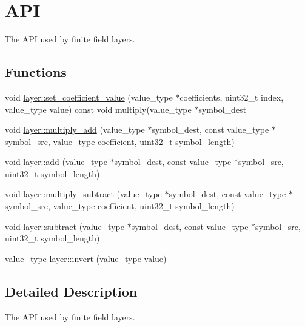 \hypertarget{group__finite__field__api}{\section{A\-P\-I}
\label{group__finite__field__api}
}


The A\-P\-I used by finite field layers.  


\subsection*{Functions}
\begin{DoxyCompactItemize}
\item 
void \hyperlink{group__finite__field__api_ga95ce95dd8b65fcaf7a35165472726d79}{layer\-::set\-\_\-coefficient\-\_\-value} (value\-\_\-type $\ast$coefficients, uint32\-\_\-t index, value\-\_\-type value) const void multiply(value\-\_\-type $\ast$symbol\-\_\-dest
\item 
void \hyperlink{group__finite__field__api_ga3d4a7a953b9c501745d857f293c4d39e}{layer\-::multiply\-\_\-add} (value\-\_\-type $\ast$symbol\-\_\-dest, const value\-\_\-type $\ast$symbol\-\_\-src, value\-\_\-type coefficient, uint32\-\_\-t symbol\-\_\-length)
\item 
void \hyperlink{group__finite__field__api_ga322b46d6ee16c2d917a088efddb3d2ce}{layer\-::add} (value\-\_\-type $\ast$symbol\-\_\-dest, const value\-\_\-type $\ast$symbol\-\_\-src, uint32\-\_\-t symbol\-\_\-length)
\item 
void \hyperlink{group__finite__field__api_ga1ab2906c47cd688c687d4a59ff26f1f3}{layer\-::multiply\-\_\-subtract} (value\-\_\-type $\ast$symbol\-\_\-dest, const value\-\_\-type $\ast$symbol\-\_\-src, value\-\_\-type coefficient, uint32\-\_\-t symbol\-\_\-length)
\item 
void \hyperlink{group__finite__field__api_ga0e7473c28cc2db06dc6849297483ad07}{layer\-::subtract} (value\-\_\-type $\ast$symbol\-\_\-dest, const value\-\_\-type $\ast$symbol\-\_\-src, uint32\-\_\-t symbol\-\_\-length)
\item 
value\-\_\-type \hyperlink{group__finite__field__api_ga4654e057e36b9ae5c97528a2f146f918}{layer\-::invert} (value\-\_\-type value)
\end{DoxyCompactItemize}


\subsection{Detailed Description}
The A\-P\-I used by finite field layers. 


